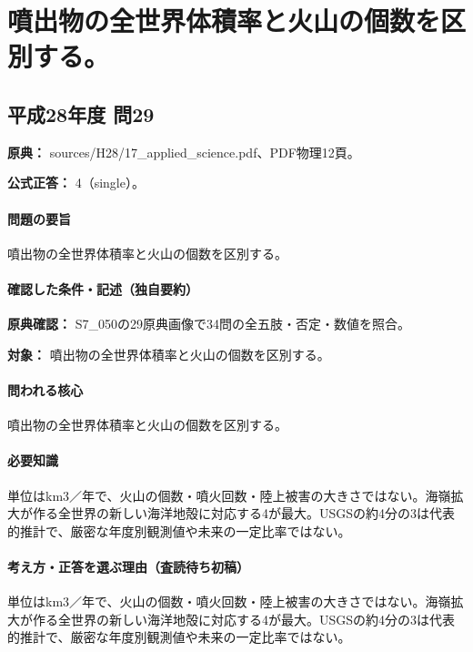 \section{噴出物の全世界体積率と火山の個数を区別する。}

\subsection{平成28年度 問29}
\label{q:h28-reg-applied-29}

\noindent\textbf{原典：} sources/H28/17\_applied\_science.pdf、PDF物理12頁。

\textbf{公式正答：} 4（single）。

\paragraph{問題の要旨} 噴出物の全世界体積率と火山の個数を区別する。

\paragraph{確認した条件・記述（独自要約）}\mbox{}\par

\noindent\textbf{原典確認：} S7\_050の29原典画像で34問の全五肢・否定・数値を照合。\par

\noindent\textbf{対象：} 噴出物の全世界体積率と火山の個数を区別する。\par

\paragraph{問われる核心} 噴出物の全世界体積率と火山の個数を区別する。

\paragraph{必要知識} 単位はkm3／年で、火山の個数・噴火回数・陸上被害の大きさではない。海嶺拡大が作る全世界の新しい海洋地殻に対応する4が最大。USGSの約4分の3は代表的推計で、厳密な年度別観測値や未来の一定比率ではない。

\paragraph{考え方・正答を選ぶ理由（査読待ち初稿）} 単位はkm3／年で、火山の個数・噴火回数・陸上被害の大きさではない。海嶺拡大が作る全世界の新しい海洋地殻に対応する4が最大。USGSの約4分の3は代表的推計で、厳密な年度別観測値や未来の一定比率ではない。

